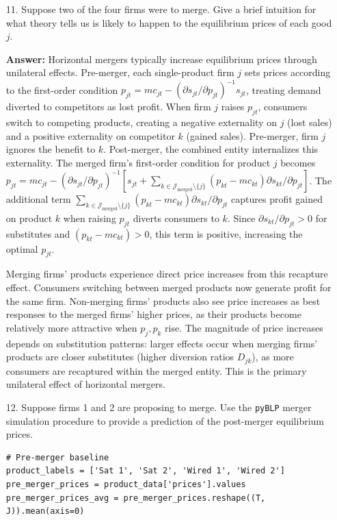 \documentclass[english,11pt]{article}
\begin{document}
\begin{enumerate}
\item[11.] Suppose two of the four firms were to merge. Give a brief
intuition for what theory tells us is likely to happen to the equilibrium
prices of each good $j$.

\textbf{Answer:}
Horizontal mergers typically increase equilibrium prices through unilateral effects. Pre-merger, each single-product firm $j$ sets prices according to the first-order condition $p_{jt} = mc_{jt} - (\partial s_{jt}/\partial p_{jt})^{-1} s_{jt}$, treating demand diverted to competitors as lost profit. When firm $j$ raises $p_{jt}$, consumers switch to competing products, creating a negative externality on $j$ (lost sales) and a positive externality on competitor $k$ (gained sales). Pre-merger, firm $j$ ignores the benefit to $k$. Post-merger, the combined entity internalizes this externality. The merged firm's first-order condition for product $j$ becomes $p_{jt} = mc_{jt} - (\partial s_{jt}/\partial p_{jt})^{-1} [s_{jt} + \sum_{k \in \mathcal{J}_{\text{merged}} \setminus \{j\}} (p_{kt} - mc_{kt}) \partial s_{kt}/\partial p_{jt}]$. The additional term $\sum_{k \in \mathcal{J}_{\text{merged}} \setminus \{j\}} (p_{kt} - mc_{kt}) \partial s_{kt}/\partial p_{jt}$ captures profit gained on product $k$ when raising $p_{jt}$ diverts consumers to $k$. Since $\partial s_{kt}/\partial p_{jt} > 0$ for substitutes and $(p_{kt} - mc_{kt}) > 0$, this term is positive, increasing the optimal $p_{jt}$.

Merging firms' products experience direct price increases from this recapture effect. Consumers switching between merged products now generate profit for the same firm. Non-merging firms' products also see price increases as best responses to the merged firms' higher prices, as their products become relatively more attractive when $p_j, p_k$ rise. The magnitude of price increases depends on substitution patterns: larger effects occur when merging firms' products are closer substitutes (higher diversion ratios $D_{jk}$), as more consumers are recaptured within the merged entity. This is the primary unilateral effect of horizontal mergers.

\item[12.] Suppose firms 1 and 2 are proposing to merge. Use the \texttt{pyBLP}
merger simulation procedure to provide a prediction of the post-merger
equilibrium prices.

\begin{verbatim}
# Pre-merger baseline
product_labels = ['Sat 1', 'Sat 2', 'Wired 1', 'Wired 2']
pre_merger_prices = product_data['prices'].values
pre_merger_prices_avg = pre_merger_prices.reshape((T, J)).mean(axis=0)


\end{verbatim}
\end{enumerate}
\end{document}
